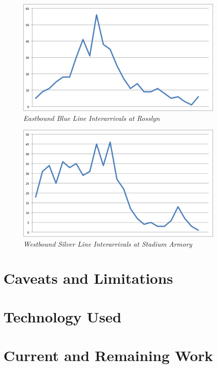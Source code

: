 \documentclass[a4paper,12pt]{article}
\begin{document}
\begin{figure}
\begin{center}
\includegraphics[width=4in]{../images/train_interarrivals/eastbound_blue_interarrivals.png}
\caption{\small \sl Eastbound Blue Line Interarrivals at Rosslyn \label{fig:eastboundblueinterarrivals}}
\end{center}
\end{figure}

\begin{figure}
\begin{center}
\includegraphics[width=4in]{../images/train_interarrivals/westbound_silver_interarrivals.png}
\caption{\small \sl Westbound Silver Line Interarrivals at Stadium Armory \label{fig:westboundsilverinterarrivals}}
\end{center}
\end{figure}


\section{Caveats and Limitations}

\section{Technology Used}

\section{Current and Remaining Work}



\end{document}
